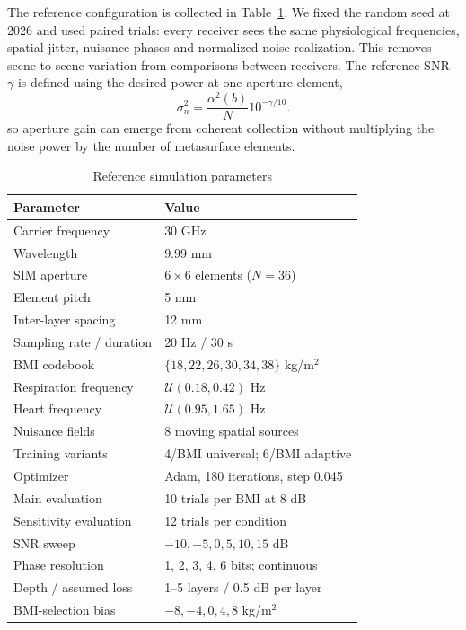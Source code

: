 \documentclass[pdflatex,sn-nature]{sn-jnl}
\begin{document}
The reference configuration is collected in Table~\ref{tab:parameters}. We fixed the
random seed at 2026 and used paired trials: every receiver sees the same physiological
frequencies, spatial jitter, nuisance phases and normalized noise realization. This
removes scene-to-scene variation from comparisons between receivers. The reference
SNR $\gamma$ is defined using the desired power at one aperture element,
\begin{equation}
\sigma_n^2=\frac{\alpha^2(b)}{N}10^{-\gamma/10}.
\label{eq:noise}
\end{equation}
so aperture gain can emerge from coherent collection without multiplying the noise
power by the number of metasurface elements.

\begin{table}[t]
\caption{Reference simulation parameters}
\label{tab:parameters}
\centering
\footnotesize
\begin{tabular}{ll}
\toprule
Parameter & Value \\
\midrule
Carrier frequency & 30 GHz \\
Wavelength & 9.99 mm \\
SIM aperture & $6\times6$ elements ($N=36$) \\
Element pitch & 5 mm \\
Inter-layer spacing & 12 mm \\
Sampling rate / duration & 20 Hz / 30 s \\
BMI codebook & $\{18,22,26,30,34,38\}$ kg/m$^2$ \\
Respiration frequency & $\mathcal U(0.18,0.42)$ Hz \\
Heart frequency & $\mathcal U(0.95,1.65)$ Hz \\
Nuisance fields & 8 moving spatial sources \\
Training variants & 4/BMI universal; 6/BMI adaptive \\
Optimizer & Adam, 180 iterations, step 0.045 \\
Main evaluation & 10 trials per BMI at 8 dB \\
Sensitivity evaluation & 12 trials per condition \\
SNR sweep & $-10,-5,0,5,10,15$ dB \\
Phase resolution & 1, 2, 3, 4, 6 bits; continuous \\
Depth / assumed loss & 1--5 layers / 0.5 dB per layer \\
BMI-selection bias & $-8,-4,0,4,8$ kg/m$^2$ \\
\bottomrule
\end{tabular}
\end{table}
\end{document}
